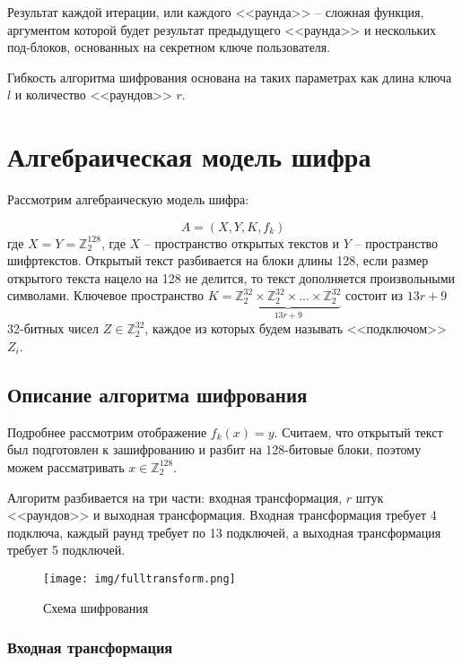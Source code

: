 \documentclass[12pt, a4paper]{article}
\begin{document}
Результат каждой итерации, или каждого <<раунда>> -- сложная функция, аргументом которой будет результат предыдущего <<раунда>> и нескольких под-блоков, основанных на секретном ключе пользователя. 

Гибкость алгоритма шифрования основана на таких параметрах как длина ключа $l$ и количество <<раундов>> $r$.

\section{Алгебраическая модель шифра}

Рассмотрим алгебраическую модель шифра:

\begin{equation}
A = \left(X, Y, K, f_k \right)
\end{equation}
где $X = Y = \mathds{Z}_2^{128}$, где $X$ -- пространство открытых текстов и $Y$ -- пространство шифртекстов. Открытый текст разбивается на блоки длины 128, если размер открытого текста нацело на 128 не делится, то текст дополняется произвольными символами. Ключевое пространство $K = \underbrace{\mathds{Z}_2^{32} \times \mathds{Z}_2^{32} \times ... \times \mathds{Z}_2^{32}}_{13r + 9}$ состоит из $13r + 9$ 32-битных чисел $Z \in \mathds{Z}_2^{32}$, каждое из которых будем называть <<подключом>> $Z_i$.

\subsection{Описание алгоритма шифрования}

Подробнее рассмотрим отображение $f_k(x) = y$. Считаем, что открытый текст был подготовлен к зашифрованию и разбит на 128-битовые блоки, поэтому можем рассматривать $x \in \mathds{Z}_2^{128}$.

Алгоритм разбивается на три части: входная трансформация, $r$ штук <<раундов>> и выходная трансформация.  Входная трансформация требует 4 подключа, каждый раунд требует по 13 подключей, а выходная трансформация требует 5 подключей.

\begin{figure}[h] 
\centering
\texttt{[image: img/fulltransform.png]}
\caption{Схема шифрования}
\label{pic:2} 
\end{figure}

\subsubsection{Входная трансформация}
\end{document}

